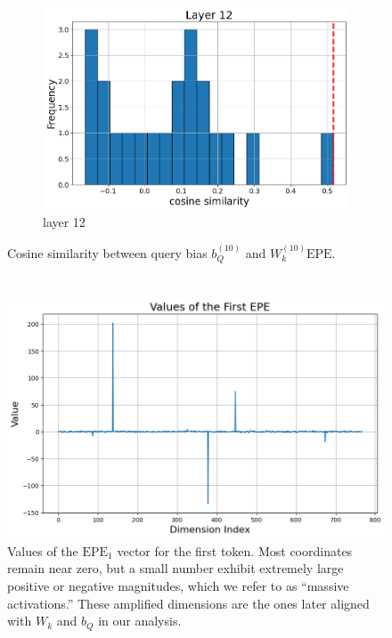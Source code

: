 \documentclass[11pt]{article}
\begin{document}
\begin{figure}[t]
\begin{subfigure}[t]{0.24\textwidth}
    \includegraphics[width=1.4\columnwidth]{figures/obs2_appendix/obs2_layer12.png}
    \caption{layer 12}
  \end{subfigure}\hfill
    \vspace{2mm}

  \caption{Cosine similarity between query bias $b_Q^{(10)}$ and $W_k^{(10)}\mathrm{EPE}$.}
\end{figure}

\section{}\label{app:massive_activations_in_ppe}

\begin{figure}[t]
  \includegraphics[width=\columnwidth]{figures/massive_activations_in_ppe.png}
  \caption{Values of the $\mathrm{EPE}_1$ vector for the first token. Most coordinates remain near zero, but a small number exhibit extremely large positive or negative magnitudes, which we refer to as ``massive activations.'' These amplified dimensions are the ones later aligned with $W_k$ and $b_Q$ in our analysis.}
\end{figure}
\end{document}
